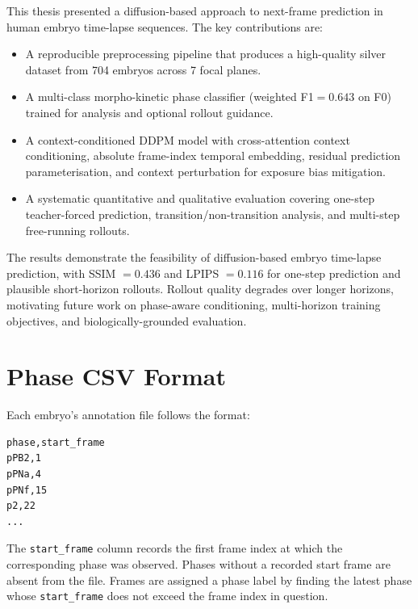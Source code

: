 \documentclass[12pt, a4paper, twoside]{report}
\begin{document}
This thesis presented a diffusion-based approach to next-frame prediction in
human embryo time-lapse sequences.
The key contributions are:
\begin{itemize}
  \item A reproducible preprocessing pipeline that produces a high-quality
        silver dataset from 704 embryos across 7 focal planes.
  \item A multi-class morpho-kinetic phase classifier (weighted F1$= 0.643$
        on F$0$) trained for analysis and optional rollout guidance.
  \item A context-conditioned DDPM model with cross-attention context
        conditioning, absolute frame-index temporal embedding, residual
        prediction parameterisation, and context perturbation for exposure bias
        mitigation.
  \item A systematic quantitative and qualitative evaluation covering
        one-step teacher-forced prediction, transition/non-transition analysis,
        and multi-step free-running rollouts.
\end{itemize}

The results demonstrate the feasibility of diffusion-based embryo time-lapse
prediction, with SSIM $= 0.436$ and LPIPS $= 0.116$ for one-step prediction
and plausible short-horizon rollouts.
Rollout quality degrades over longer horizons, motivating future work on
phase-aware conditioning, multi-horizon training objectives, and
biologically-grounded evaluation.

\printbibliography[heading=bibintoc, title={References}]

\appendix

\chapter{Phase CSV Format}
\label{app:phase_csv}

Each embryo's annotation file follows the format:
\begin{verbatim}
phase,start_frame
pPB2,1
pPNa,4
pPNf,15
p2,22
...
\end{verbatim}
The \texttt{start\_frame} column records the first frame index at which
the corresponding phase was observed.
Phases without a recorded start frame are absent from the file.
Frames are assigned a phase label by finding the latest phase whose
\texttt{start\_frame} does not exceed the frame index in question.
\end{document}
